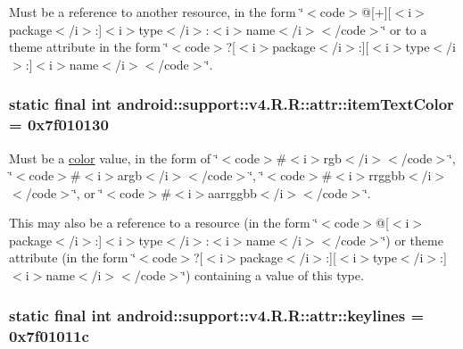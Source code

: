 Must be a reference to another resource, in the form \char`\"{}$<$code$>$@\mbox{[}+\mbox{]}\mbox{[}$<$i$>$package$<$/i$>$:\mbox{]}$<$i$>$type$<$/i$>$:$<$i$>$name$<$/i$>$$<$/code$>$\char`\"{} or to a theme attribute in the form \char`\"{}$<$code$>$?\mbox{[}$<$i$>$package$<$/i$>$:\mbox{]}\mbox{[}$<$i$>$type$<$/i$>$:\mbox{]}$<$i$>$name$<$/i$>$$<$/code$>$\char`\"{}. \hypertarget{classandroid_1_1support_1_1v4_1_1_r_1_1attr_f6965b18d032fe8eed90aa34290998d8}{
\subsubsection[{itemTextColor}]{\setlength{\rightskip}{0pt plus 5cm}static final int android::support::v4.R.R::attr::itemTextColor = 0x7f010130}}
\label{classandroid_1_1support_1_1v4_1_1_r_1_1attr_f6965b18d032fe8eed90aa34290998d8}


Must be a \hyperlink{classandroid_1_1support_1_1v4_1_1_r_1_1color}{color} value, in the form of \char`\"{}$<$code$>$\#$<$i$>$rgb$<$/i$>$$<$/code$>$\char`\"{}, \char`\"{}$<$code$>$\#$<$i$>$argb$<$/i$>$$<$/code$>$\char`\"{}, \char`\"{}$<$code$>$\#$<$i$>$rrggbb$<$/i$>$$<$/code$>$\char`\"{}, or \char`\"{}$<$code$>$\#$<$i$>$aarrggbb$<$/i$>$$<$/code$>$\char`\"{}. 

This may also be a reference to a resource (in the form \char`\"{}$<$code$>$@\mbox{[}$<$i$>$package$<$/i$>$:\mbox{]}$<$i$>$type$<$/i$>$:$<$i$>$name$<$/i$>$$<$/code$>$\char`\"{}) or theme attribute (in the form \char`\"{}$<$code$>$?\mbox{[}$<$i$>$package$<$/i$>$:\mbox{]}\mbox{[}$<$i$>$type$<$/i$>$:\mbox{]}$<$i$>$name$<$/i$>$$<$/code$>$\char`\"{}) containing a value of this type. \hypertarget{classandroid_1_1support_1_1v4_1_1_r_1_1attr_cf15c70dc6d4d00cf58f551e0995fc82}{
\subsubsection[{keylines}]{\setlength{\rightskip}{0pt plus 5cm}static final int android::support::v4.R.R::attr::keylines = 0x7f01011c}}
\label{classandroid_1_1support_1_1v4_1_1_r_1_1attr_cf15c70dc6d4d00cf58f551e0995fc82}


